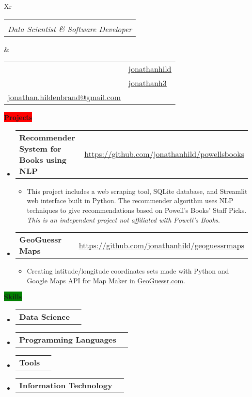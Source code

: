 \documentclass[letterpaper,12pt]{article}[leftmargin=*]
\makeatletter
\def \fullname {Jonathan Hildenbrand}
\def \subtitle {Data Scientist \& Software Developer}
\def \githubicon {\faGithub}
\def \githublink {https://github.com/jonathanhild}
\def \githubtext {jonathanhild}
\def \linkedinicon {\faLinkedin}
\def \linkedinlink {https://linkedin.com/in/jonathanh3}
\def \linkedintext {jonathanh3}
\def \phoneicon {\faPhone}
\def \phonetext {+1-971-409-0695}
\def \emailicon {\faEnvelope}
\def \emaillink {mailto:jonathan.hildenbrand@gmail.com}
\def \emailtext {jonathan.hildenbrand@gmail.com}
\def \locationicon {\faMapMarker}
\def \locationtext {Portland, OR, USA}
\def \targeticon {\faBinoculars}
\def \targettext {Local \& Remote WFH}
\def \headertype {\doublecol} %
\def \entryspacing {-0pt}
\def \location {\locationicon \hspace{3pt}{\color{links}\locationtext}}
\def \target {\targeticon \hspace{3pt}{\color{links}\targettext}}
\def \phone {\phoneicon \hspace{3pt}{\color{links}{\phonetext}}}
\def \linkedin {\linkedinicon \hspace{3pt}\href{\linkedinlink}{\underline{\linkedintext}}}
\def \email {\emailicon \hspace{3pt}\href{\emaillink}{\underline{\emailtext}}}
\def \github {\githubicon \hspace{3pt}\href{\githublink}{\underline{\githubtext}}}
\newcommand{\projects}[2]{\vspace{6pt}
  \colorbox{Red}{\color{white}\raggedbottom\normalsize\textbf{{#1}{\hspace{9pt}#2\hspace{4pt}}}}
}
\newcommand{\skills}[2]{\vspace{6pt}
  \colorbox{Green}{\color{white}\raggedbottom\normalsize\textbf{{#1}{\hspace{9pt}#2\hspace{4pt}}}}
}
\newcommand{\resumeEntryStart}{\begin{itemize}[leftmargin=2.5mm]}
\newcommand{\resumeEntryEnd}{\end{itemize}\vspace{\entryspacing}}
\newcommand{\resumeItemListStart}{\begin{itemize}[leftmargin=4.5mm]}
\newcommand{\resumeItemListEnd}{\end{itemize}}
\newcommand{\resumeItem}[1]{
  \item\small{
    {#1 \vspace{-2pt}}
  }
}
\newcommand{\repo}[2]{\href{#1}{\underline{#2}}}
\newcommand{\resumeEntryTD}[2]{
  \vspace{-1pt}\item[]
    \begin{tabularx}{0.97\textwidth}{X@{\hspace{60pt}}r}
      \textbf{\color{primary}#1} & {\firabook\color{accent}\small#2} \\
    \end{tabularx}\vspace{-6pt}
}
\newcommand{\resumeEntryS}[2]{
  \item[]
    \vspace{-1pt}
      \begin{tabular}{ p{2in} m{5.5in} }
      {\small{\textbf{#1 }}} & {\small{#2}}
      \end{tabular}\vspace{-6pt}
}
\newcommand{\tag}[1]{%
  \tikzmarknode[fill=white,fill
opacity=0,draw=subtle!60!subtle,thick,rounded corners,inner sep=0.4ex,text height=1.5ex,text depth=.25ex, text opacity=1]{test}{\small{#1}}
}
\newcommand{\doublecol}[6]{
  \begin{tabularx}{\textwidth}{Xr}
    {
      \begin{tabular}[c]{l}
        \fontsize{24}{34}\selectfont{\color{primary}{{\textbf{\fullname}}}} \\
        {\textit{\subtitle}} %
      \end{tabular}
    } & {
      \begin{tabular}[c]{l@{\hspace{1.5em}}l}
        {\small#4} & {\small#1} \\
        {\small#5} & {\small#2} \\
        {\small#6} & {\small#3}
      \end{tabular}
    }
  \end{tabularx}
}
\newcommand{\singlecol}[6]{
  \begin{tabularx}{\textwidth}{Xr}
    {
      \begin{tabular}[b]{l}
        \fontsize{35}{45}\selectfont{\color{primary}{{\textbf{\fullname}}}} \\
        {\textit{\subtitle}} %
      \end{tabular}
    } & {
      \begin{tabular}[c]{l}
        {\small#1} \\
        {\small#2} \\
        {\small#3} \\
        {\small#4} \\
        {\small#5} \\
        {\small#6}
      \end{tabular}
    }
  \end{tabularx}
}
\makeatother
\begin{document}

\headertype{\github}{\linkedin}{\phone}{\location}{\target}{\email} %

\projects{\faFlask}{Projects}

  \resumeEntryStart
    \resumeEntryTD
      {Recommender System for Books using NLP}{\repo{https://github.com/jonathanhild/powellsbooks}{https://github.com/jonathanhild/powellsbooks}}
    \resumeItemListStart
      \resumeItem {\tag{In Process} This project includes a web scraping tool, SQLite database, and Streamlit web interface built in Python. The recommender algorithm uses NLP techniques to give recommendations based on Powell's Books' Staff Picks. \textit{This is an independent project not affiliated with Powell’s Books.}}
    \resumeItemListEnd
  \resumeEntryTD
      {GeoGuessr Maps}{\repo{https://github.com/jonathanhild/geoguessrmaps}{https://github.com/jonathanhild/geoguessrmaps}}
    \resumeItemListStart
      \resumeItem {Creating latitude/longitude coordinates sets made with Python and Google Maps API for Map Maker in \href{https://www.geoguessr.com}{\underline{GeoGuessr.com}}.}
    \resumeItemListEnd
  \resumeEntryEnd

\skills{\faGears}{Skills}
 \resumeEntryStart
  \resumeEntryS{Data Science} {\tag{Data Cleaning \& ETL}\tag{Machine Learning}\tag{ Technical Communication}\tag{Accounting}\tag{Project Management}}
  \resumeEntryS{Programming Languages} {\tag{Python}\tag{T-SQL}\tag{Regex}\tag{HTML / CSS / JS}\tag{C / C++}\tag{VBA}}
  \resumeEntryS{Tools} {\tag{Anaconda}\tag{PostgreSQL}\tag{SQL Server}\tag{SQLite}\tag{SSMS}\tag{Git}\tag{Excel}}
  \resumeEntryS{Information Technology} {\tag{Database Admin}\tag{Ubuntu 16.04+}\tag{Windows Server Admin}\tag{Dynamics NAV}}

 \resumeEntryEnd
 
\end{document}
